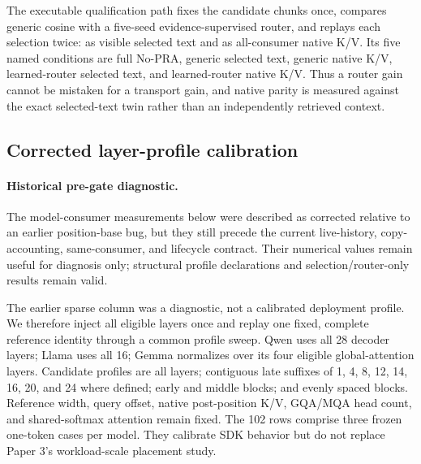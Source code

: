 \documentclass[11pt]{article}
\begin{document}
The executable qualification path fixes the candidate chunks once, compares
generic cosine with a five-seed evidence-supervised router, and replays each
selection twice: as visible selected text and as all-consumer native K/V.  Its
five named conditions are full No-PRA, generic selected text, generic native
K/V, learned-router selected text, and learned-router native K/V.  Thus a
router gain cannot be mistaken for a transport gain, and native parity is
measured against the exact selected-text twin rather than an independently
retrieved context.

\subsection{Corrected layer-profile calibration}

\paragraph{Historical pre-gate diagnostic.}
The model-consumer measurements below were described as corrected relative to
an earlier position-base bug, but they still precede the current live-history,
copy-accounting, same-consumer, and lifecycle contract. Their numerical values
remain useful for diagnosis only; structural profile declarations and
selection/router-only results remain valid.

The earlier sparse column was a diagnostic, not a calibrated deployment
profile. We therefore inject all eligible layers once and replay one fixed,
complete reference identity through a common profile sweep. Qwen uses all 28
decoder layers; Llama uses all 16; Gemma normalizes over its four eligible
global-attention layers. Candidate profiles are all layers; contiguous late
suffixes of 1, 4, 8, 12, 14, 16, 20, and 24 where defined; early and middle
blocks; and evenly spaced blocks. Reference width, query offset, native
post-position K/V, GQA/MQA head count, and shared-softmax attention remain
fixed. The 102 rows comprise three frozen one-token cases per model. They
calibrate SDK behavior but do not replace Paper 3's workload-scale placement
study.
\end{document}
